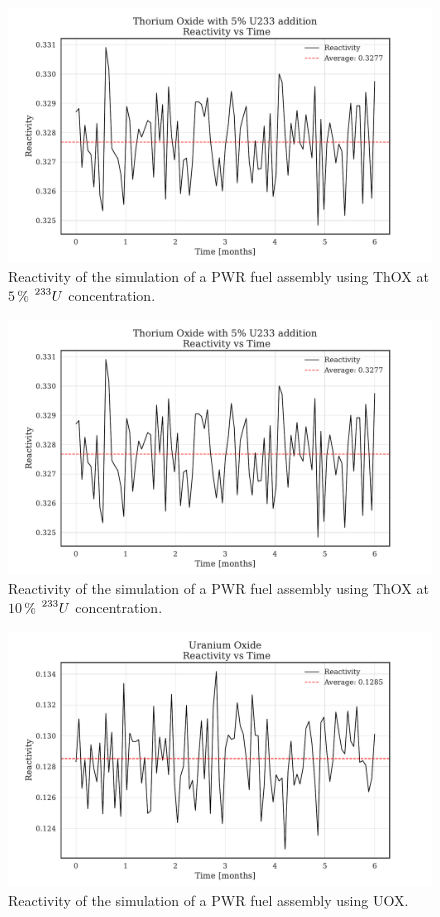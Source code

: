 \begin{figure}
    \centering
    \includegraphics[width=1\textwidth, scale=0.5]{Kap7/Figures_Kap7/Reactivity_vs_Time_ThOX_U233_5.pdf}
    \caption{Reactivity of the simulation of a PWR fuel assembly using ThOX at \(5 \, \%\) \(\prescript{233}{}{U}\) concentration.}
    \label{fig:reactivity_th_u233_5}
\end{figure}

\begin{figure}
    \centering
    \includegraphics[width=1\textwidth, scale=0.5]{Kap7/Figures_Kap7/Reactivity_vs_Time_ThOX_U233_5.pdf}
    \caption{Reactivity of the simulation of a PWR fuel assembly using ThOX at \(10 \, \%\) \(\prescript{233}{}{U}\) concentration.}
    \label{fig:reactivity_th_u233_10}   
\end{figure}

\begin{figure}
    \centering
    \includegraphics[width=1\textwidth, scale=0.5]{Kap7/Figures_Kap7/Reactivity_vs_Time_UOX.pdf}
    \caption{Reactivity of the simulation of a PWR fuel assembly using UOX.}
    \label{fig:reactivity_uox}
\end{figure}